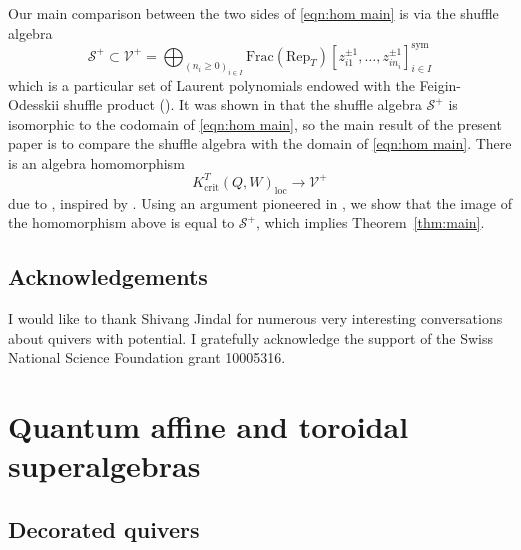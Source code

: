 \documentclass{amsart}
\def\CS{{\mathcal{S}}}
\def\CV{{\mathcal{V}}}
\begin{document}
\medskip 

\noindent Our main comparison between the two sides of \eqref{eqn:hom main} is via the shuffle algebra
\begin{equation}
\label{eqn:shuffle intro}
\CS^+ \subset \CV^+ = \bigoplus_{(n_i \geq 0)_{i \in I}} \text{Frac}(\text{Rep}_T)[z_{i1}^{\pm 1}, \dots, z_{in_i}^{\pm 1}]_{i \in I}^{\text{sym}}
\end{equation}
which is a particular set of Laurent polynomials endowed with the Feigin-Odesskii shuffle product (\cite{FO}). It was shown in \cite{NT} that the shuffle algebra $\CS^+$ is isomorphic to the codomain of \eqref{eqn:hom main}, so the main result of the present paper is to compare the shuffle algebra with the domain of \eqref{eqn:hom main}. There is an algebra homomorphism
\begin{equation}
\label{eqn:map to shuffle}
K^T_{\text{crit}}(Q,W)_{\text{loc}} \rightarrow \CV^+
\end{equation}
due to \cite{P}, inspired by \cite{KS}. Using an argument pioneered in \cite{Z}, we show that the image of the homomorphism above is equal to $\CS^+$, which implies Theorem~\ref{thm:main}. 

\medskip 
 
\subsection{Acknowledgements}  I would like to thank Shivang Jindal for numerous very interesting conversations about quivers with potential. I gratefully acknowledge the support of the Swiss National Science Foundation grant 10005316.

\bigskip 

\section{Quantum affine and toroidal superalgebras}
\label{sec:algebra}

\medskip 

\subsection{Decorated quivers}
\label{sub:quivers}
\end{document}
